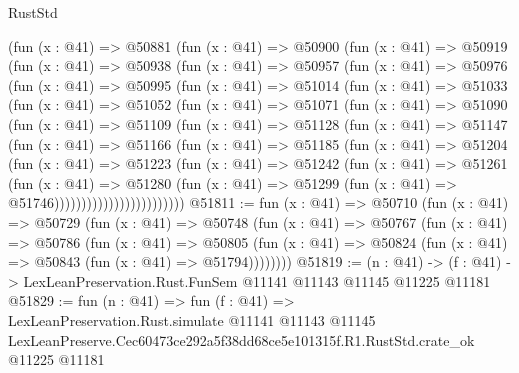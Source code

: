 \begin{lexlean}{RustStd}
\begin{coremodule}
    (fun (x : @41) =>
    @50881
      (fun (x : @41) =>
      @50900
        (fun (x : @41) =>
        @50919
          (fun (x : @41) =>
          @50938
            (fun (x : @41) =>
            @50957
              (fun (x : @41) =>
              @50976
                (fun (x : @41) =>
                @50995
                  (fun (x : @41) =>
                  @51014
                    (fun (x : @41) =>
                    @51033
                      (fun (x : @41) =>
                      @51052
                        (fun (x : @41) =>
                        @51071
                          (fun (x : @41) =>
                          @51090
                            (fun (x : @41) =>
                            @51109
                              (fun (x : @41) =>
                              @51128
                                (fun (x : @41) =>
                                @51147
                                  (fun (x : @41) =>
                                  @51166
                                    (fun (x : @41) =>
                                    @51185
                                      (fun (x : @41) =>
                                      @51204
                                        (fun (x : @41) =>
                                        @51223
                                          (fun (x : @41) =>
                                          @51242
                                            (fun (x : @41) =>
                                            @51261
                                              (fun (x : @41) =>
                                              @51280
                                                (fun (x : @41) =>
                                                @51299
                                                  (fun (x : @41) => @51746))))))))))))))))))))))))
@51811 := fun (x : @41) =>
  @50710
    (fun (x : @41) =>
    @50729
      (fun (x : @41) =>
      @50748
        (fun (x : @41) =>
        @50767
          (fun (x : @41) =>
          @50786
            (fun (x : @41) =>
            @50805
              (fun (x : @41) => @50824 (fun (x : @41) => @50843 (fun (x : @41) => @51794))))))))
@51819 := (n : @41) ->
  (f : @41) -> LexLeanPreservation.Rust.FunSem @11141 @11143 @11145 @11225 @11181
@51829 := fun (n : @41) =>
  fun (f : @41) =>
  LexLeanPreservation.Rust.simulate
    @11141
    @11143
    @11145
    LexLeanPreserve.Cec60473ce292a5f38dd68ce5e101315f.R1.RustStd.crate_ok
    @11225
    @11181
\end{coremodule}
\end{lexlean}
